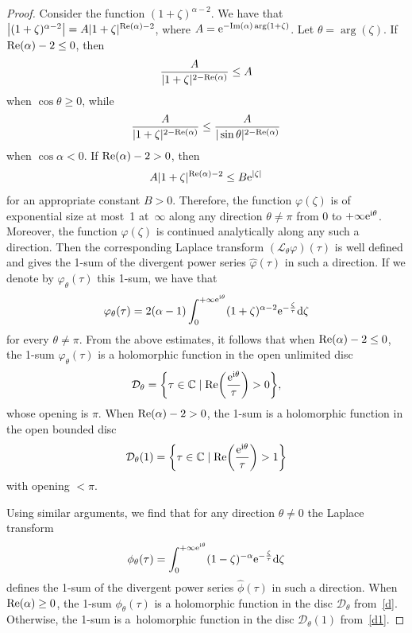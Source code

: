\documentclass[pdftex]{sigma}
\numberwithin{equation}{section}
\begin{document}
\begin{proof}
 Consider the function $(1+\zeta)^{\alpha-2}$. We have that $\bigl|(1+\zeta)^{\alpha-2}\bigr|=A |1+\zeta|^{{\rm Re}(\alpha) -2}$, where
 $A={\rm e}^{-{\rm Im} (\alpha) \arg (1+\zeta)}$. Let $\theta=\arg (\zeta)$. If ${\rm Re} (\alpha) -2 \leq 0$, then
 \[
 \frac{A}{|1+\zeta|^{2 - {\rm Re}(\alpha)}} \leq A
 \]
 when $\cos \theta \geq 0$, while
 \[
 \frac{A}{|1+\zeta|^{2 - {\rm Re}(\alpha)}} \leq \frac{A}{|\sin \theta|^{2 - {\rm Re}(\alpha)}}
 \]
 when $\cos \alpha < 0$. If ${\rm Re} (\alpha) - 2 >0$, then
 \[
 A |1+\zeta|^{{\rm Re}(\alpha) -2} \leq B {\rm e}^{|\zeta|}
 \]
 for an appropriate constant $B > 0$. Therefore, the function $\varphi(\zeta)$ is of exponential size at most~1 at~$\infty$
 along any direction $\theta \neq \pi$ from $0$ to $+\infty {\rm e}^{{\rm i} \theta}$. Moreover, the function $\varphi(\zeta)$ is
 continued analytically along any such a direction. Then the corresponding Laplace transform $(\mathcal{L}_{\theta} \varphi)(\tau)$
 is well defined and gives the 1-sum of the divergent power series $\hat{\varphi}(\tau)$ in such a direction. If we denote
 by $\varphi_{\theta}(\tau)$ this 1-sum, we have that
 \[
 \varphi_{\theta}(\tau)=2 (\alpha-1)
 \int_0^{+\infty {\rm e}^{{\rm i} \theta}}
 (1+\zeta)^{\alpha-2} {\rm e}^{-\frac{\zeta}{\tau}} {\rm d} \zeta
 \]
 for every $\theta \neq \pi$. From the above estimates, it follows that when ${\rm Re} (\alpha) -2 \leq 0$, the 1-sum
 $\varphi_{\theta}(\tau)$ is a holomorphic function in the open unlimited disc
 \begin{equation}
 \mathcal{D}_{\theta}=\biggl\{ \tau\in\mathbb{C} \mid {\rm Re} \biggl(\frac{{\rm e}^{{\rm i} \theta}}{\tau}\biggr) > 0 \biggr\} ,\label{d}
 \end{equation}
 whose opening is $\pi$.
 When ${\rm Re} (\alpha) - 2 > 0$, the 1-sum is a holomorphic function in the open bounded disc
 \begin{equation}
 \mathcal{D}_{\theta}(1)=\biggl\{ \tau\in\mathbb{C} \mid {\rm Re} \biggl(\frac{{\rm e}^{{\rm i} \theta}}{\tau}\biggr) > 1 \biggr\}\label{d1}
 \end{equation}
 with opening $ < \pi$.

 Using similar arguments, we find that for any direction $\theta \neq 0$ the Laplace transform
 \[
 \phi_{\theta}(\tau)=\int_0^{+\infty {\rm e}^{{\rm i} \theta}}
 (1-\zeta)^{-\alpha} {\rm e}^{-\frac{\zeta}{\tau}} {\rm d} \zeta
 \]
 defines the 1-sum of the divergent power series $\hat{\phi}(\tau)$ in such a direction. When ${\rm Re} (\alpha) \geq 0$,
 the 1-sum $\phi_{\theta}(\tau)$ is a holomorphic function in the disc $\mathcal{D}_{\theta}$ from~\eqref{d}. Otherwise, the
 1-sum is a~holomorphic function in the disc $\mathcal{D}_{\theta}(1)$ from~\eqref{d1}.
 \end{proof}
\end{document}
